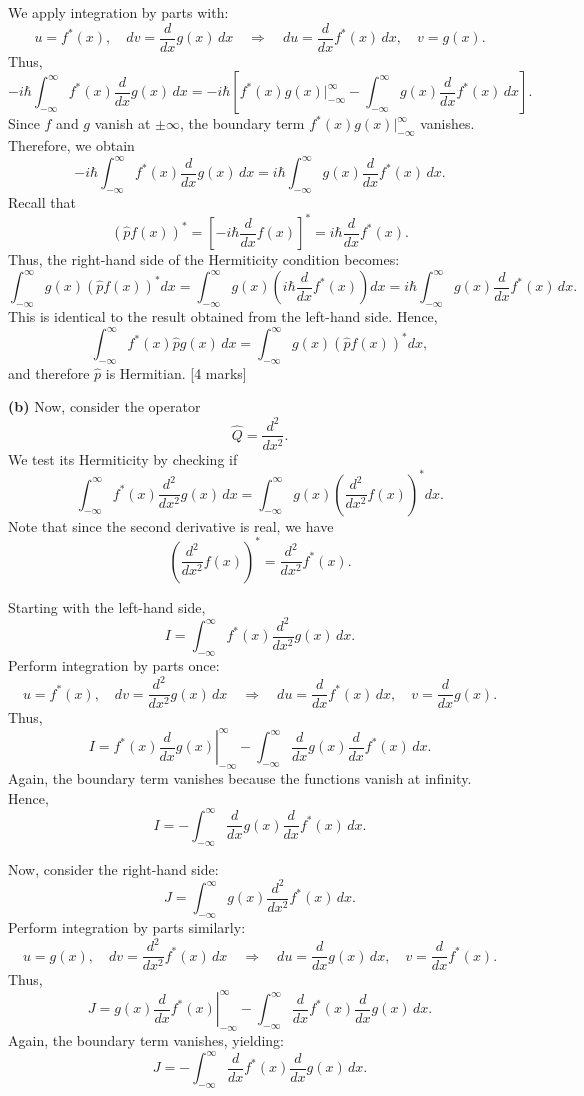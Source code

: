 \documentclass{article}
\begin{document}
We apply integration by parts with:
\[
u = f^*(x),\quad dv = \frac{d}{dx}g(x)\,dx \quad \Longrightarrow \quad du = \frac{d}{dx}f^*(x)\, dx,\quad v = g(x).
\]
Thus,
\[
-i\hbar\int_{-\infty}^{\infty} f^*(x) \frac{d}{dx}g(x)\, dx = -i\hbar\left[ f^*(x)g(x) \Big|_{-\infty}^{\infty} - \int_{-\infty}^{\infty} g(x) \frac{d}{dx}f^*(x)\, dx \right].
\]
Since \(f\) and \(g\) vanish at \(\pm \infty\), the boundary term \(f^*(x)g(x)\Big|_{-\infty}^{\infty}\) vanishes. Therefore, we obtain
\[
-i\hbar\int_{-\infty}^{\infty} f^*(x) \frac{d}{dx}g(x)\, dx = i\hbar \int_{-\infty}^{\infty} g(x) \frac{d}{dx}f^*(x)\, dx.
\]
Recall that
\[
\left(\hat{p}f(x)\right)^* = \left[-i\hbar \frac{d}{dx}f(x)\right]^* = i\hbar \frac{d}{dx}f^*(x).
\]
Thus, the right-hand side of the Hermiticity condition becomes:
\[
\int_{-\infty}^{\infty} g(x) \left(\hat{p} f(x)\right)^* dx = \int_{-\infty}^{\infty} g(x) \left(i\hbar \frac{d}{dx}f^*(x)\right) dx = i\hbar \int_{-\infty}^{\infty} g(x) \frac{d}{dx}f^*(x)\, dx.
\]
This is identical to the result obtained from the left-hand side. Hence, 
\[
\int_{-\infty}^{\infty} f^*(x) \hat{p} g(x)\, dx = \int_{-\infty}^{\infty} g(x) \left(\hat{p} f(x)\right)^* dx,
\]
and therefore \(\hat{p}\) is Hermitian. \hfill [4 marks]

\textbf{(b)} Now, consider the operator 
\[
\hat{Q} = \frac{d^2}{dx^2}.
\]
We test its Hermiticity by checking if
\[
\int_{-\infty}^{\infty} f^*(x) \frac{d^2}{dx^2}g(x)\, dx = \int_{-\infty}^{\infty} g(x) \left(\frac{d^2}{dx^2}f(x)\right)^* dx.
\]
Note that since the second derivative is real, we have
\[
\left(\frac{d^2}{dx^2}f(x)\right)^* = \frac{d^2}{dx^2}f^*(x).
\]

Starting with the left-hand side,
\[
I = \int_{-\infty}^{\infty} f^*(x) \frac{d^2}{dx^2}g(x)\, dx.
\]
Perform integration by parts once:
\[
u = f^*(x),\quad dv = \frac{d^2}{dx^2}g(x)\, dx \quad \Longrightarrow \quad du = \frac{d}{dx}f^*(x)\, dx,\quad v = \frac{d}{dx}g(x).
\]
Thus,
\[
I = \left. f^*(x)\frac{d}{dx}g(x) \right|_{-\infty}^{\infty} - \int_{-\infty}^{\infty} \frac{d}{dx}g(x) \frac{d}{dx}f^*(x)\, dx.
\]
Again, the boundary term vanishes because the functions vanish at infinity. Hence,
\[
I = -\int_{-\infty}^{\infty} \frac{d}{dx}g(x) \frac{d}{dx}f^*(x)\, dx.
\]

Now, consider the right-hand side:
\[
J = \int_{-\infty}^{\infty} g(x) \frac{d^2}{dx^2}f^*(x)\, dx.
\]
Perform integration by parts similarly:
\[
u = g(x),\quad dv = \frac{d^2}{dx^2}f^*(x)\, dx \quad \Longrightarrow \quad du = \frac{d}{dx}g(x)\, dx,\quad v = \frac{d}{dx}f^*(x).
\]
Thus,
\[
J = \left. g(x)\frac{d}{dx}f^*(x) \right|_{-\infty}^{\infty} - \int_{-\infty}^{\infty} \frac{d}{dx}f^*(x) \frac{d}{dx}g(x)\, dx.
\]
Again, the boundary term vanishes, yielding:
\[
J = -\int_{-\infty}^{\infty} \frac{d}{dx}f^*(x) \frac{d}{dx}g(x)\, dx.
\]
\end{document}

